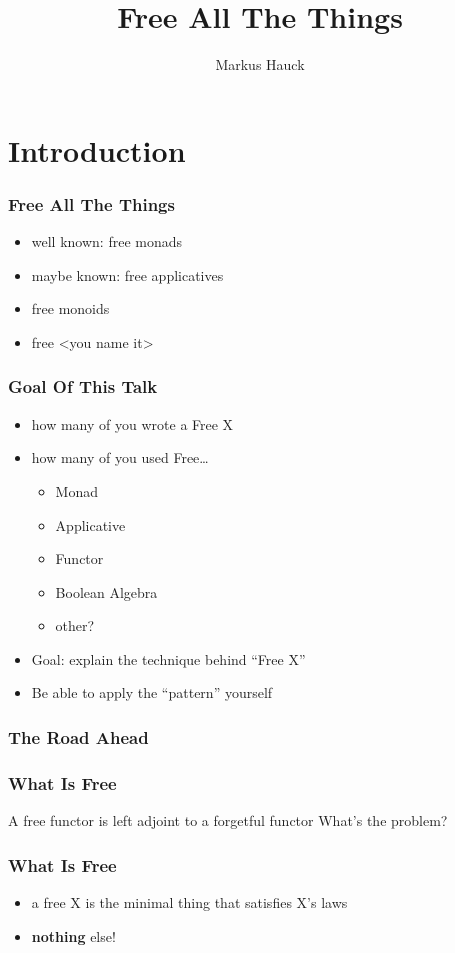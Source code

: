 \documentclass{beamer}
\title{Free All The Things}
\author{Markus Hauck}
\begin{document}
\begin{frame}
  \titlepage{}
\end{frame}

\section{Introduction}\label{sec:introduction}

\begin{frame}
\frametitle{Free All The Things}
\begin{itemize}
\item well known: free monads
\item maybe known: free applicatives
\item free monoids
\item free <you name it>
\end{itemize}
\end{frame}

\begin{frame}
  \frametitle{Goal Of This Talk}
  \begin{itemize}
  \item how many of you wrote a Free X
  \item how many of you used Free\ldots
    \begin{itemize}
    \item Monad
    \item Applicative
    \item Functor
    \item Boolean Algebra
    \item other?
    \end{itemize}
  \item Goal: explain the technique behind ``Free X''
  \item Be able to apply the ``pattern'' yourself
  \end{itemize}
\end{frame}

\begin{frame}
  \frametitle{The Road Ahead}
\end{frame}

\begin{frame}
  \frametitle{What Is Free}
  A free functor is left adjoint to a forgetful functor
  What's the problem?
\end{frame}

\begin{frame}
  \frametitle{What Is Free}
  \begin{itemize}
  \item a free X is the minimal thing that satisfies X's laws
  \item \textbf{nothing} else!

  \end{itemize}
\end{frame}
\end{document}
